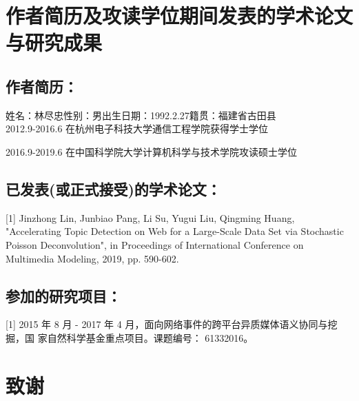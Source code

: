 \chapter{作者简历及攻读学位期间发表的学术论文与研究成果}


\section*{作者简历：}
	姓名：林尽忠\qquad 性别：男\qquad 出生日期：1992.2.27\qquad 籍贯：福建省古田县\\

	2012.9-2016.6	在杭州电子科技大学通信工程学院获得学士学位

	2016.9-2019.6 	在中国科学院大学计算机科学与技术学院攻读硕士学位

\section*{已发表(或正式接受)的学术论文：}

[1] Jinzhong Lin, Junbiao Pang, Li Su, Yugui Liu, Qingming Huang, "Accelerating Topic Detection on Web for a Large-Scale Data Set via Stochastic Poisson Deconvolution", in Proceedings of International Conference on Multimedia Modeling, 2019, pp. 590-602.



\section*{参加的研究项目：}
[1] 2015 年 8 月 - 2017 年 4 月，面向网络事件的跨平台异质媒体语义协同与挖掘，国
家自然科学基金重点项目。课题编号： 61332016。

\chapter[致谢]{致\quad 谢}%
\thispagestyle{noheaderstyle}%

